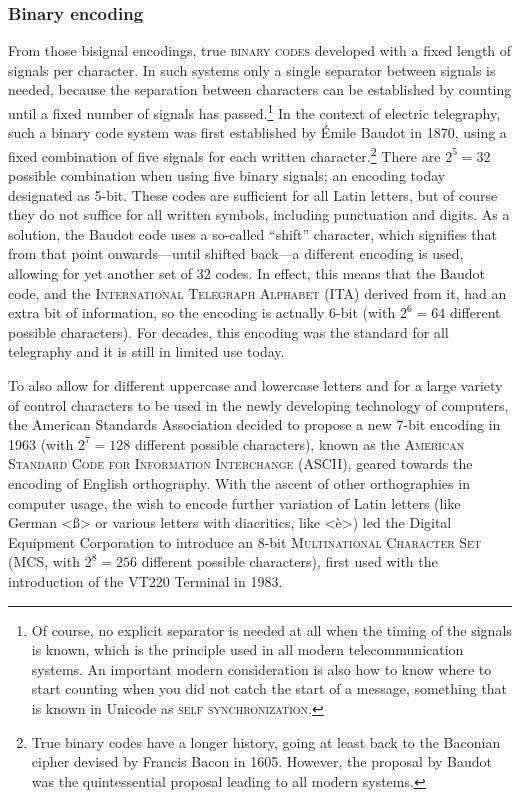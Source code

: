 \subsubsection*{Binary encoding}

From those bisignal encodings, true \textsc{binary codes} developed with a fixed
length of signals per character. In such systems only a single separator between
signals is needed, because the separation between characters can be established
by counting until a fixed number of signals has passed.\footnote{Of course, no
explicit separator is needed at all when the timing of the signals is known, which is
the principle used in all modern telecommunication systems. An important modern
consideration is also how to know where to start counting when you did not catch
the start of a message, something that is known in Unicode as \textsc{self
synchronization}.} In the context of electric telegraphy, such a binary code
system was first established by Émile Baudot in 1870, using a fixed combination
of five signals for each written character.\footnote{True binary codes have a
longer history, going at least back to the Baconian cipher devised by Francis
Bacon in 1605. However, the proposal by Baudot was the quintessential proposal
leading to all modern systems.} There are $2^5 = 32$ possible combination when
using five binary signals; an encoding today designated as 5-bit. These
codes are sufficient for all Latin letters, but of course they do not suffice
for all written symbols, including punctuation and digits. As a solution, the
Baudot code uses a so-called ``shift'' character, which signifies that from
that point onwards---until shifted back---a different encoding is used, allowing
for yet another set of 32 codes. In effect, this means that the Baudot code, and
the \textsc{International Telegraph Alphabet} (ITA) derived from it, had an
extra bit of information, so the encoding is actually 6-bit (with $2^6
= 64$ different possible characters). For decades, this encoding was the
standard for all telegraphy and it is still in limited use today.

To also allow for different uppercase and lowercase letters and for a large
variety of control characters to be used in the newly developing technology of
computers, the American Standards Association decided to propose a new 7-bit
encoding in 1963 (with $2^7 = 128$ different possible characters), known as the
\textsc{American Standard Code for Information Interchange} (ASCII), geared
towards the encoding of English orthography. With the ascent of other
orthographies in computer usage, the wish to encode further variation of Latin
letters (like German <ß> or various letters with diacritics, like <è>) led the
Digital Equipment Corporation to introduce an 8-bit \textsc{Multinational
Character Set} (MCS, with $2^8 = 256$ different possible characters), first used
with the introduction of the VT{\large 220} Terminal in 1983. 


